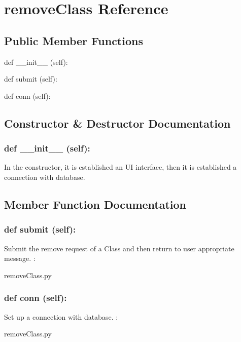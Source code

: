 \hypertarget{removeClass}{\section{removeClass Reference}
\label{removeClass}
}
\subsection*{Public Member Functions}
\begin{DoxyCompactItemize}
\item 
def {\_\_init\_\_} (self):
\item 
def {submit} (self):
\item 
def {conn} (self):
\end{DoxyCompactItemize}

\subsection{Constructor \& Destructor Documentation}
\hypertarget{class_poly_aa3def076b74bed67904976ad4f9fe9b1}{
\subsubsection[{def __init__ (self):}]{\setlength{\rightskip}{0pt plus 5cm}def {\_\_init\_\_} (self): 
}}
In the constructor, it is established an UI interface, then it is  established a connection with database.

\subsection{Member Function Documentation}
\hypertarget{class_poly_a14a7ad77ce612b0c54f531d307ee4b39}{
\subsubsection[{def submit (self):}]{\setlength{\rightskip}{0pt plus 5cm}def {submit} (self):}}\label{class_poly_a14a7ad77ce612b0c54f531d307ee4b39}
Submit the remove request of a Class and then return to user appropriate message.
:\begin{DoxyCompactItemize}
\item 
removeClass.\-py\end{DoxyCompactItemize}


\hypertarget{class_poly_a14a7ad77ce612b0c54f531d307ee4b39}{
\subsubsection[{def conn (self):}]{\setlength{\rightskip}{0pt plus 5cm}def {conn} (self):}}\label{class_poly_a14a7ad77ce612b0c54f531d307ee4b39}
Set up a connection with database.
:\begin{DoxyCompactItemize}
\item 
removeClass.\-py\end{DoxyCompactItemize}

